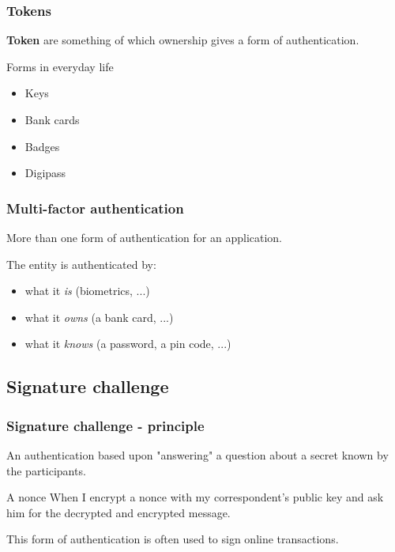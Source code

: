 \begin{frame}
\frametitle{Tokens}
\textbf{Token} are something of which ownership gives a form of
authentication.
\begin{exampleblock}{Forms in everyday life}
\begin{itemize}
\item Keys
\item Bank cards
\item Badges
\item Digipass
\end{itemize}
\end{exampleblock}
\end{frame}

\begin{frame}
\frametitle{Multi-factor authentication}
\begin{center}
More than one form of authentication for an application.
\end{center}
The entity is authenticated by:
\begin{itemize}
\item what it \emph{is} (biometrics, ...)
\item what it \emph{owns} (a bank card, ...)
\item what it \emph{knows} (a password, a pin code, ...)
\end{itemize}
\end{frame}

\subsection{Signature challenge}

\begin{frame}
\frametitle{Signature challenge - principle}
An authentication based upon "answering" a question about a secret
known by the participants.
\begin{exampleblock}{A nonce}
When I encrypt a nonce with my correspondent's public key and ask him for the
decrypted and encrypted message.
\end{exampleblock}
This form of authentication is often used to sign online transactions.
\end{frame}

